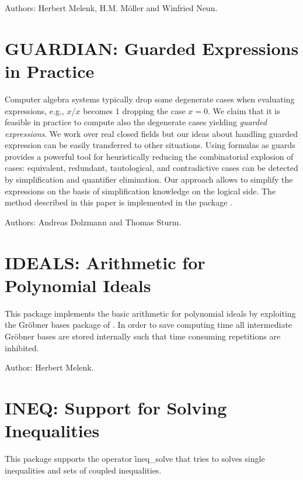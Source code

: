 Authors: Herbert Melenk, H.M. M\"oller and Winfried Neun.



\newpage

\section{GUARDIAN: Guarded Expressions in Practice}
\label{GUARDIAN}

Computer algebra systems typically drop some degenerate cases when
evaluating expressions, e.g., $x/x$ becomes $1$ dropping the case
$x=0$. We claim that it is feasible in practice to compute also the
degenerate cases yielding \emph{guarded expressions}. We work over real
closed fields but our ideas about handling guarded expression can be
easily transferred to other situations. Using formulas as guards
provides a powerful tool for heuristically reducing the combinatorial
explosion of cases: equivalent, redundant, tautological, and
contradictive cases can be detected by simplification and quantifier
elimination. Our approach allows to simplify the expressions on the
basis of simplification knowledge on the logical side. The method
described in this paper is implemented in the \REDUCE package
.

Authors: Andreas Dolzmann and Thomas Sturm.



\newpage

\section{IDEALS: Arithmetic for Polynomial Ideals}

This package implements the basic arithmetic for polynomial ideals by
exploiting the Gr\"obner bases package of \REDUCE.  In order to save
computing time all intermediate Gr\"obner bases are stored internally such
that time consuming repetitions are inhibited.

Author: Herbert Melenk.



\newpage

\iffalse
\section{INEQ: Support for Solving Inequalities}

This package supports the operator \f{ineq\_solve} that
tries to solves single inequalities and sets of coupled inequalities.

